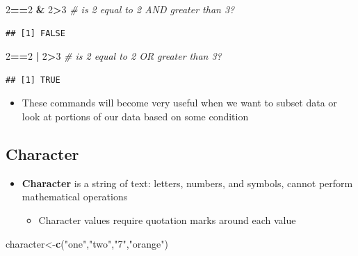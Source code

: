 \documentclass[]{book}
\newenvironment{Shaded}{\begin{snugshade}}{\end{snugshade}}
\newcommand{\KeywordTok}[1]{\textcolor[rgb]{0.13,0.29,0.53}{\textbf{#1}}}
\newcommand{\DecValTok}[1]{\textcolor[rgb]{0.00,0.00,0.81}{#1}}
\newcommand{\StringTok}[1]{\textcolor[rgb]{0.31,0.60,0.02}{#1}}
\newcommand{\CommentTok}[1]{\textcolor[rgb]{0.56,0.35,0.01}{\textit{#1}}}
\newcommand{\OperatorTok}[1]{\textcolor[rgb]{0.81,0.36,0.00}{\textbf{#1}}}
\newcommand{\NormalTok}[1]{#1}
\providecommand{\tightlist}{%
  \setlength{\itemsep}{0pt}\setlength{\parskip}{0pt}}
\theoremstyle{definition}
\theoremstyle{definition}
\theoremstyle{definition}
\theoremstyle{remark}
\begin{document}
\begin{Shaded}
\begin{Highlighting}[]
\DecValTok{2}\OperatorTok{==}\DecValTok{2} \OperatorTok{&}\StringTok{ }\DecValTok{2}\OperatorTok{>}\DecValTok{3} \CommentTok{# is 2 equal to 2 AND greater than 3? }
\end{Highlighting}
\end{Shaded}

\begin{verbatim}
## [1] FALSE
\end{verbatim}

\begin{Shaded}
\begin{Highlighting}[]
\DecValTok{2}\OperatorTok{==}\DecValTok{2} \OperatorTok{|}\StringTok{ }\DecValTok{2}\OperatorTok{>}\DecValTok{3} \CommentTok{# is 2 equal to 2 OR greater than 3? }
\end{Highlighting}
\end{Shaded}

\begin{verbatim}
## [1] TRUE
\end{verbatim}

\begin{itemize}
\tightlist
\item
  These commands will become very useful when we want to subset data or
  look at portions of our data based on some condition
\end{itemize}

\subsection{Character}\label{character}

\begin{itemize}
\tightlist
\item
  \textbf{Character} is a string of text: letters, numbers, and symbols,
  cannot perform mathematical operations

  \begin{itemize}
  \tightlist
  \item
    Character values require quotation marks around each value
  \end{itemize}
\end{itemize}

\begin{Shaded}
\begin{Highlighting}[]
\NormalTok{character<-}\KeywordTok{c}\NormalTok{(}\StringTok{"one"}\NormalTok{,}\StringTok{"two"}\NormalTok{,}\StringTok{"7"}\NormalTok{,}\StringTok{"orange"}\NormalTok{)}
\end{Highlighting}
\end{Shaded}
\end{document}
